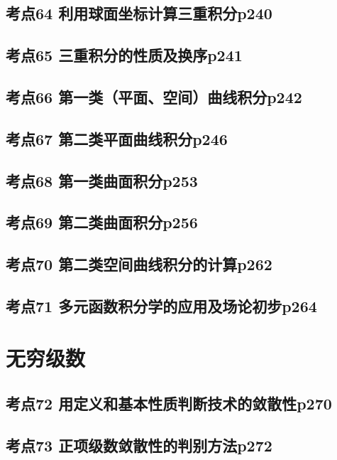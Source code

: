 \section{考点64 利用球面坐标计算三重积分p240}

\section{考点65 三重积分的性质及换序p241}

\section{考点66 第一类（平面、空间）曲线积分p242}

\section{考点67 第二类平面曲线积分p246}

\section{考点68 第一类曲面积分p253}

\section{考点69 第二类曲面积分p256}

\section{考点70 第二类空间曲线积分的计算p262}

\section{考点71 多元函数积分学的应用及场论初步p264}

\chapter{无穷级数}

\section{考点72 用定义和基本性质判断技术的敛散性p270}

\section{考点73 正项级数敛散性的判别方法p272}

